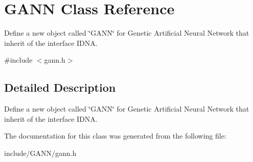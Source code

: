 \section{G\+A\+N\+N Class Reference}
\label{class_g_a_n_n}


Define a new object called \char`\"{}\+G\+A\+N\+N\char`\"{} for Genetic Artificial Neural Network that inherit of the interface I\+D\+N\+A.  




{\ttfamily \#include $<$gann.\+h$>$}



\subsection{Detailed Description}
Define a new object called \char`\"{}\+G\+A\+N\+N\char`\"{} for Genetic Artificial Neural Network that inherit of the interface I\+D\+N\+A. 

The documentation for this class was generated from the following file\+:\begin{DoxyCompactItemize}
\item 
include/\+G\+A\+N\+N/gann.\+h\end{DoxyCompactItemize}
